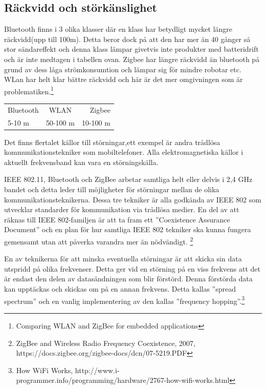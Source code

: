 \documentclass[a4paper,12pt,fleqn]{article}
\begin{document}
\subsection{Räckvidd och störkänslighet}
Bluetooth finns i 3 olika klasser där en klass har betydligt mycket längre räckvidd(upp till 100m). Detta beror dock på att den har mer än 40 gånger så stor sändareffekt och denna klass lämpar givetvis inte produkter med batteridrift och är inte medtagen i tabellen ovan. Zigbee har längre räckvidd än bluetooth på grund av dess låga strömkonsumtion och lämpar sig för mindre robotar etc. 
WLan har helt klar bättre räckvidd och  här är det mer omgivningen som är problematiken.\footnote{
Comparing WLAN and ZigBee for embedded applications}

\begin{tabular}{lcr}
	\hline
	Bluetooth & WLAN & Zigbee \\
	5-10 m  & 50-100 m   & 10-100 m\\
	\hline
 \end{tabular}
\newline

Det finns flertalet källor till störningar,ett exempel är andra trådlösa kommunikationstekniker som mobiltelefoner. Alla elektromagnetiska källor i aktuellt frekvensband kan vara en störningskälla.

IEEE 802.11, Bluetooth och ZigBee arbetar samtliga helt eller delvis i 2,4 GHz bandet och detta leder till möjligheter för störningar mellan de olika kommunikationsteknikerna. Dessa tre tekniker är alla godkända av IEEE 802 som utvecklar standarder för kommunikation via trådlösa medier. En del av att räknas till IEEE 802-familjen är att ta fram ett ''Coexistence Assurance Document'' och en plan för hur samtliga IEEE 802 tekniker ska kunna fungera gemensamt utan att påverka varandra mer än nödvändigt. 
\footnote{ZigBee and Wireless Radio
Frequency Coexistence, 2007, https://docs.zigbee.org/zigbee-docs/dcn/07-5219.PDF}

En av teknikerna för att minska eventuella störningar är att skicka sin data utspridd på olika frekvenser. Detta ger vid en störning på en viss frekvens att det är endast den delen av datasändningen som blir förstörd. Denna förstörda data kan upptäckas och skickas om på en annan frekvens. Detta kallas ''spread spectrum'' och en vanlig implementering av den kallas ''frequency hopping''.\footnote{
How WiFi Works, http://www.i-programmer.info/programming/hardware/2767-how-wifi-works.html}

\newpage
\end{document}
